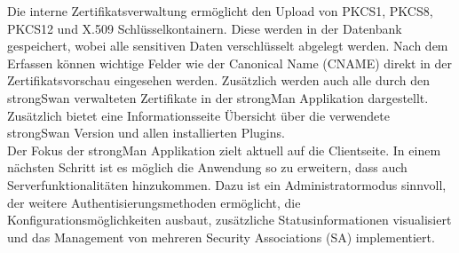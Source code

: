 Die interne Zertifikatsverwaltung ermöglicht den Upload von PKCS1, PKCS8, PKCS12 und X.509 Schlüsselkontainern. Diese werden in der Datenbank gespeichert, wobei alle sensitiven Daten verschlüsselt abgelegt werden. Nach dem Erfassen können wichtige Felder wie der Canonical Name (CNAME) direkt in der Zertifikatsvorschau eingesehen werden. Zusätzlich werden auch alle durch den strongSwan verwalteten Zertifikate in der strongMan Applikation dargestellt.\\

Zusätzlich bietet eine Informationsseite Übersicht über die verwendete strongSwan Version und allen installierten Plugins.\\


Der Fokus der strongMan Applikation zielt aktuell auf die Clientseite. In einem nächsten Schritt ist es möglich die Anwendung so zu erweitern, dass auch Serverfunktionalitäten hinzukommen. Dazu ist ein Administratormodus sinnvoll, der weitere Authentisierungsmethoden ermöglicht, die Konfigurationsmöglichkeiten ausbaut, zusätzliche Statusinformationen visualisiert und das Management von mehreren Security Associations (SA) implementiert. 
